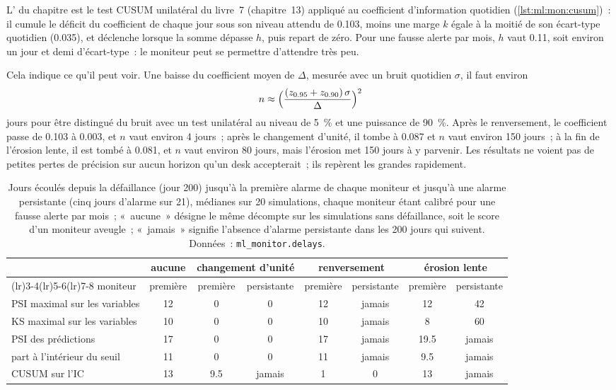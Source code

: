 L' du chapitre est le test CUSUM unilatéral du livre~7 (chapitre~13) appliqué au coefficient d'information quotidien
(\cref{lst:ml:mon:cusum})~: il cumule le déficit du coefficient de chaque jour sous son niveau attendu de 0.103, moins une
marge $k$ égale à la moitié de son écart-type quotidien (0.035), et déclenche lorsque la somme dépasse $h$, puis repart de zéro. Pour une fausse
alerte par mois, $h$ vaut 0.11, soit environ un jour et demi d'écart-type~: le moniteur peut se permettre d'attendre très peu.

Cela indique ce qu'il peut voir. Une baisse du coefficient moyen de $\Delta$, mesurée avec un bruit quotidien $\sigma$, il faut environ
\[
n\approx\Bigl(\frac{(z_{0.95}+z_{0.90})\,\sigma}{\Delta}\Bigr)^2
\]
jours pour être distingué du bruit avec un test unilatéral au niveau de 5~\% et une puissance de 90~\%. Après le renversement, le coefficient passe de 0.103 à
0.003, et $n$ vaut environ 4 jours~; après le changement d'unité, il tombe à 0.087 et $n$ vaut environ 150 jours~; à la fin de l'érosion lente, il
est tombé à 0.081, et $n$ vaut environ 80 jours, mais l'érosion met 150 jours à y parvenir. Les résultats ne voient pas de petites pertes de
précision sur aucun horizon qu'un desk accepterait~; ils repèrent les grandes rapidement.

\begin{table}[htbp]
\centering\small
\small\setlength{\tabcolsep}{4pt}%
\begin{tabular}{@{}>{\raggedright\arraybackslash}p{3.0cm}ccccccc@{}}
\toprule
 & aucune & \multicolumn{2}{c}{changement d'unité} & \multicolumn{2}{c}{renversement} & \multicolumn{2}{c}{érosion lente}\\
\cmidrule(lr){2-2}\cmidrule(lr){3-4}\cmidrule(lr){5-6}\cmidrule(lr){7-8}
moniteur & première & première & persistante & première & persistante & première & persistante\\
\midrule
PSI maximal sur les variables & 12 & 0 & 0 & 12 & jamais & 12 & 42\\
KS maximal sur les variables & 10 & 0 & 0 & 10 & jamais & 8 & 60\\
PSI des prédictions & 17 & 0 & 0 & 17 & jamais & 19.5 & jamais\\
part à l'intérieur du seuil & 11 & 0 & 0 & 11 & jamais & 9.5 & jamais\\
CUSUM sur l'IC & 13 & 9.5 & jamais & 1 & 0 & 13 & jamais\\
\bottomrule
\end{tabular}
\caption{Jours écoulés depuis la défaillance (jour 200) jusqu'à la première alarme de chaque moniteur et jusqu'à une alarme persistante (cinq jours d'alarme sur 21), médianes
sur 20 simulations, chaque moniteur étant calibré pour une fausse alerte par mois~; «~aucune~» désigne le même décompte sur les simulations sans défaillance, soit
le score d'un moniteur aveugle~; «~jamais~» signifie l'absence d'alarme persistante dans les 200 jours qui suivent. Données~: \texttt{ml\_monitor.delays}.}
\label{tab:ml:mon:delays}
\end{table}

